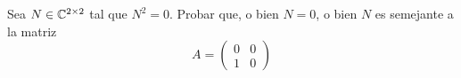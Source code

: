 \item Sea $N\in\mathbb{C}^{2\times2}$ tal que $N^2=0$. Probar que, o bien $N=0$, o bien $N$ es semejante a la matriz\[A=\begin{pmatrix}
        0&0\\1&0
    \end{pmatrix}\]
    \begin{mdframed}[style=s]
        
    \end{mdframed}